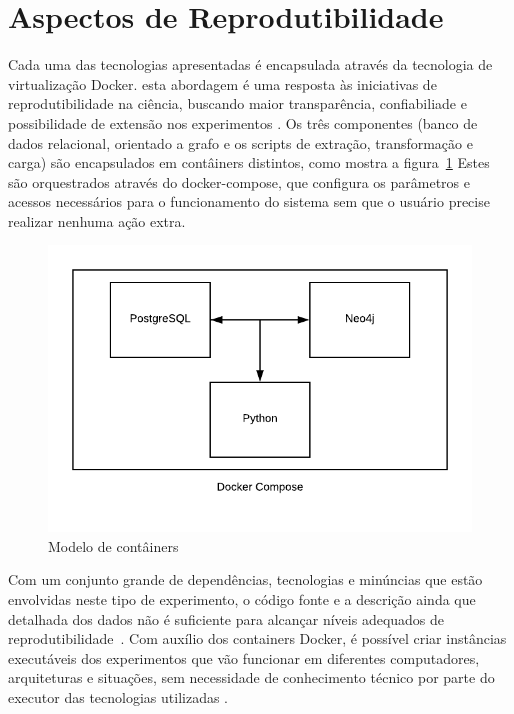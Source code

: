 \documentclass[a4paper,12pt]{monografia}
\theoremstyle{plain}
\theoremstyle{definition}
\theoremstyle{remark}
\begin{document}
\section{Aspectos de Reprodutibilidade}

Cada uma das tecnologias apresentadas é encapsulada através da tecnologia de virtualização Docker. esta abordagem é uma resposta às iniciativas de reprodutibilidade na ciência, buscando maior transparência, confiabiliade e possibilidade de extensão nos experimentos \cite{freire2012}. Os três componentes (banco de dados relacional, orientado a grafo e os scripts de extração, transformação e carga) são encapsulados em contâiners distintos, como mostra a figura~\ref{fig:docker-model} Estes são orquestrados através do docker-compose, que configura os parâmetros e acessos necessários para o funcionamento do sistema sem que o usuário precise realizar nenhuma ação extra.

\begin{figure}[!htbp]
 \includegraphics[width=\textwidth]{docker-model}
 \caption{Modelo de contâiners}\label{fig:docker-model}
\end{figure}


Com um conjunto grande de dependências, tecnologias e minúncias que estão envolvidas neste tipo de experimento, o código fonte e a descrição ainda que detalhada dos dados não é suficiente para alcançar níveis adequados de reprodutibilidade~\cite{ince2012}. Com auxílio dos containers Docker, é possível criar instâncias executáveis dos experimentos que vão funcionar em diferentes computadores, arquiteturas e situações, sem necessidade de conhecimento técnico por parte do executor das tecnologias utilizadas \cite{boettiger2015}.
\end{document}
